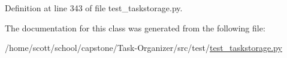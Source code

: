 \-Definition at line 343 of file test\-\_\-taskstorage.\-py.



\-The documentation for this class was generated from the following file\-:\begin{DoxyCompactItemize}
\item 
/home/scott/school/capstone/\-Task-\/\-Organizer/src/test/\hyperlink{test__taskstorage_8py}{test\-\_\-taskstorage.\-py}\end{DoxyCompactItemize}
